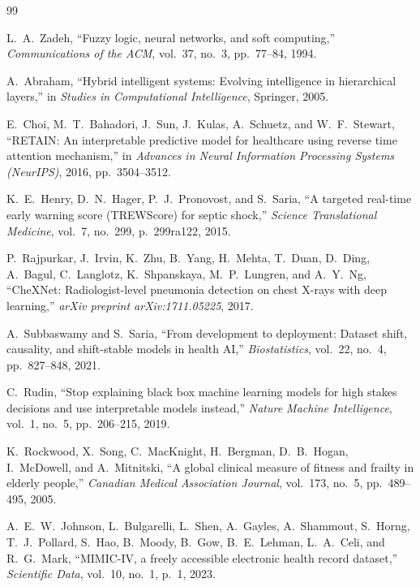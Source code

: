 \documentclass[review,12pt,authoryear]{elsarticle}
\begin{document}
\begin{thebibliography}{99}

L.~A.~Zadeh, ``Fuzzy logic, neural networks, and soft computing,'' \textit{Communications of the ACM}, vol.~37, no.~3, pp.~77--84, 1994.

A.~Abraham, ``Hybrid intelligent systems: Evolving intelligence in hierarchical layers,'' in \textit{Studies in Computational Intelligence}, Springer, 2005.

E.~Choi, M.~T.~Bahadori, J.~Sun, J.~Kulas, A.~Schuetz, and W.~F.~Stewart, ``RETAIN: An interpretable predictive model for healthcare using reverse time attention mechanism,'' in \textit{Advances in Neural Information Processing Systems (NeurIPS)}, 2016, pp.~3504--3512.

K.~E.~Henry, D.~N.~Hager, P.~J.~Pronovost, and S.~Saria, ``A targeted real-time early warning score (TREWScore) for septic shock,'' \textit{Science Translational Medicine}, vol.~7, no.~299, p.~299ra122, 2015.

P.~Rajpurkar, J.~Irvin, K.~Zhu, B.~Yang, H.~Mehta, T.~Duan, D.~Ding, A.~Bagul, C.~Langlotz, K.~Shpanskaya, M.~P.~Lungren, and A.~Y.~Ng, ``CheXNet: Radiologist-level pneumonia detection on chest X-rays with deep learning,'' \textit{arXiv preprint arXiv:1711.05225}, 2017.

A.~Subbaswamy and S.~Saria, ``From development to deployment: Dataset shift, causality, and shift-stable models in health AI,'' \textit{Biostatistics}, vol.~22, no.~4, pp.~827--848, 2021.

C.~Rudin, ``Stop explaining black box machine learning models for high stakes decisions and use interpretable models instead,'' \textit{Nature Machine Intelligence}, vol.~1, no.~5, pp.~206--215, 2019.

K.~Rockwood, X.~Song, C.~MacKnight, H.~Bergman, D.~B.~Hogan, I.~McDowell, and A.~Mitnitski, ``A global clinical measure of fitness and frailty in elderly people,'' \textit{Canadian Medical Association Journal}, vol.~173, no.~5, pp.~489--495, 2005.

A.~E.~W.~Johnson, L.~Bulgarelli, L.~Shen, A.~Gayles, A.~Shammout, S.~Horng, T.~J.~Pollard, S.~Hao, B.~Moody, B.~Gow, B.~E.~Lehman, L.~A.~Celi, and R.~G.~Mark, ``MIMIC-IV, a freely accessible electronic health record dataset,'' \textit{Scientific Data}, vol.~10, no.~1, p.~1, 2023.


\end{thebibliography}
\end{document}
